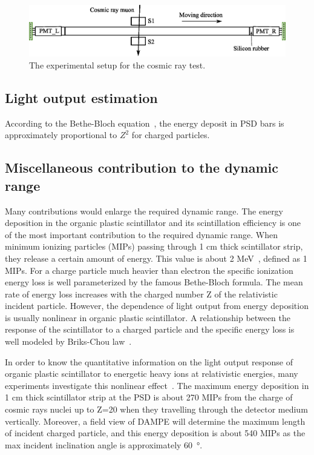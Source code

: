 \documentclass[5p, times]{elsarticle}
\begin{document}
\begin{figure}[t]
 \centering
 \includegraphics[width=140mm]{cosmic_test}
\caption{The experimental setup for the cosmic ray test.}
\label{fig:cosmic_test}
\end{figure} 

\subsection{Light output estimation}
According to the Bethe-Bloch equation~\cite{olive_review_2014}, the energy deposit in PSD bars is approximately proportional to $Z^2$ for charged particles.

\subsection{Miscellaneous contribution to the dynamic range}

Many contributions would enlarge the required dynamic range. 
The energy deposition in the organic plastic scintillator and its scintillation efficiency is one of the most important contribution to the required dynamic range. 
When minimum ionizing particles (MIPs) passing through 1 cm thick scintillator strip, they release a certain amount of energy. 
This value is about 2 MeV~\cite{olive_review_2014}, defined as 1 MIPs. 
For a charge particle much heavier than electron the specific ionization energy loss is well parameterized by the famous Bethe-Bloch formula. 
The mean rate of energy loss increases with the charged number Z of the relativistic incident particle. 
However, the dependence of light output from energy deposition is usually nonlinear in organic plastic scintillator. 
A relationship between the response of the scintillator to a charged particle and the specific energy loss is well modeled by Briks-Chou law~\cite{birks1951scintillations,birks1964theory}. 

In order to know the quantitative information on the light output response of organic plastic scintillator to energetic heavy ions at relativistic energies, many experiments investigate this nonlinear effect~\cite{dwyer1985plastic,bindi2005performance,marrocchesi2011beam}. 
The maximum energy deposition in 1 cm thick scintillator strip at the PSD is about 270 MIPs from the charge of cosmic rays nuclei up to Z=20 when they travelling through the detector medium vertically. 
Moreover, a field view of DAMPE will determine the maximum length of incident charged particle, and this energy deposition is about 540 MIPs as the max incident inclination angle is approximately \SI{60}{\degree}.
\end{document}
